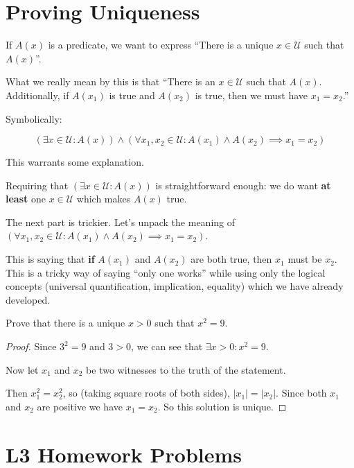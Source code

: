 \newpage



\section{Proving Uniqueness}

If $A(x)$ is a predicate, we want to express ``There is a unique $x \in \mathcal{U}$ such that $A(x)$''.

What we really mean by this is that ``There is an $x \in \mathcal{U}$ such that $A(x)$.  Additionally, if $A(x_1)$ is true and $A(x_2)$ is true, then we must have $x_1 = x_2$.''

Symbolically:

\[
(\exists x \in \mathcal{U}: A(x)) \wedge (\forall x_1, x_2 \in \mathcal{U}: A(x_1) \wedge A(x_2) \implies x_1 = x_2  )
\]

This warrants some explanation.

Requiring that $(\exists x \in \mathcal{U}: A(x)) $ is straightforward enough:  we do want \textbf{at least} one $x \in \mathcal{U}$ which makes $A(x)$ true.

The next part is trickier.  Let's unpack the meaning of $(\forall x_1, x_2 \in \mathcal{U}: A(x_1) \wedge A(x_2) \implies x_1 = x_2  )$.

This is saying that \textbf{if} $A(x_1)$ and $A(x_2)$ are both true, then $x_1$ must be $x_2$.  This is a tricky way of saying ``only one works'' while using only the logical concepts (universal quantification, implication, equality) which we have already developed.

\begin{xca}
	Prove that there is a unique $x > 0$ such that $x^2  = 9$.
\end{xca}

\begin{proof}
		Since $3^2 = 9$ and $3 > 0$,  we can see that $\exists x > 0 : x^2 = 9$.
		
		Now let $x_1$ and $x_2$ be two witnesses to the truth of the statement.  
		
		Then $x_1^2 = x_2^2$, so (taking square roots of both sides), $|x_1| = |x_2|$.  Since both $x_1$ and $x_2$ are positive we have $x_1 = x_2$.  So this solution is unique.
	\end{proof}

\newpage

\section{L3 Homework Problems}

